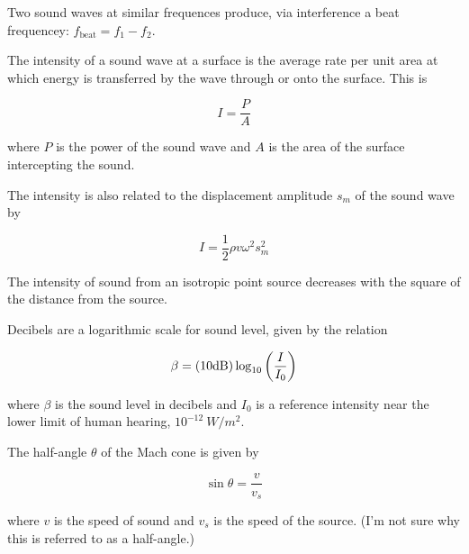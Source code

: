 \documentclass{article}
\begin{document}
Two sound waves at similar frequences produce, via interference a beat frequencey: $f_{\text{beat}} = f_1 - f_2.$ 

The intensity of a sound wave at a surface is the average rate per unit area at which energy is transferred by the wave through or onto the surface. This is

\[ I = \frac{P}{A} \]

where $P$ is the power of the sound wave and $A$ is the area of the surface intercepting the sound.

The intensity is also related to the displacement amplitude $s_m$ of the sound wave by

\[ I = \frac{1}{2} \rho v \omega^2 s^2_m \]

The intensity of sound from an isotropic point source decreases with the square of the distance from the source.

Decibels are a logarithmic scale for sound level, given by the relation

\[ \beta = (10 \text{dB}) \log_{10}{\left(\frac{I}{I_0}\right)} \]

where $\beta$ is the sound level in decibels and $I_0$ is a reference intensity near the lower limit of human hearing, $10^{-12} ~ W/m^2.$

The half-angle $\theta$ of the Mach cone is given by

\[ \sin{\theta} = \frac{v}{v_s} \]

where $v$ is the speed of sound and $v_s$ is the speed of the source. (I'm not sure why this is referred to as a half-angle.)
\end{document}
